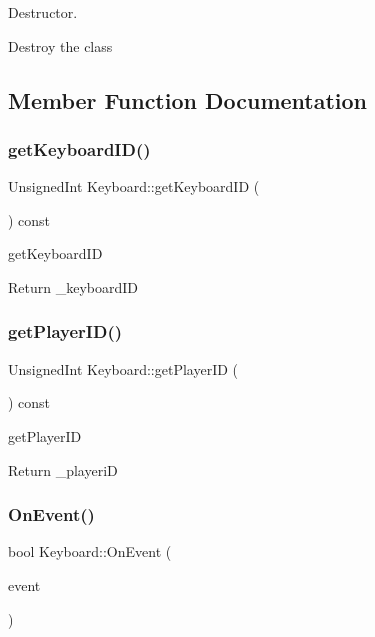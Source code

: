 Destructor. 

Destroy the class 

\subsection{Member Function Documentation}
\mbox{\label{classKeyboard_a8bc4a7d865e268c0d126aa3f0a913bbb}} 
\subsubsection{\texorpdfstring{get\+Keyboard\+I\+D()}{getKeyboardID()}}
{\footnotesize\ttfamily Unsigned\+Int Keyboard\+::get\+Keyboard\+ID (\begin{DoxyParamCaption}\item[{void}]{ }\end{DoxyParamCaption}) const}



get\+Keyboard\+ID 

Return \+\_\+keyboard\+ID \mbox{\label{classKeyboard_ac8fe530866f42dd3a62ea66054bc148b}} 
\subsubsection{\texorpdfstring{get\+Player\+I\+D()}{getPlayerID()}}
{\footnotesize\ttfamily Unsigned\+Int Keyboard\+::get\+Player\+ID (\begin{DoxyParamCaption}\item[{void}]{ }\end{DoxyParamCaption}) const}



get\+Player\+ID 

Return \+\_\+playeriD \mbox{\label{classKeyboard_ad6974153a0c29b55c1b8765d0d6ccbfa}} 
\subsubsection{\texorpdfstring{On\+Event()}{OnEvent()}}
{\footnotesize\ttfamily bool Keyboard\+::\+On\+Event (\begin{DoxyParamCaption}\item[{const irr\+::\+S\+Event \&}]{event }\end{DoxyParamCaption})\hspace{0.3cm}{\ttfamily [virtual]}}



